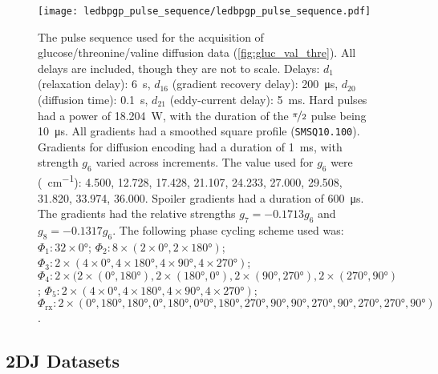\begin{figure}[H]
    \texttt{[image: ledbpgp\_pulse\_sequence/ledbpgp\_pulse\_sequence.pdf]}
    \caption[
        The pulse sequence used for the acquisition of the glucose/threonine/valine
        diffusion data presented in \cref{fig:gluc_val_thre}.
    ]{
        The pulse sequence used for the acquisition of glucose/threonine/valine
        diffusion data (\cref{fig:gluc_val_thre}). All
        delays are included, though they are not to scale.
        Delays:
        $d_1$ (relaxation delay): \qty{6}{\second},
        $d_{16}$ (gradient recovery delay): \qty{200}{\micro\second},
        $d_{20}$ (diffusion time): \qty{0.1}{\second},
        $d_{21}$ (eddy-current delay): \qty{5}{\milli\second}.
        Hard pulses had a power of \qty{18.204}{\watt},
        with the duration of the $\nicefrac{\pi}{2}$ pulse being
        \qty{10}{\micro\second}.
        All gradients had a smoothed square profile
        (\texttt{SMSQ10.100}).
        Gradients for diffusion encoding had a duration of
        \qty{1}{\milli\second}, with strength $g_6$ varied across increments.
        The value used for $g_6$ were (\unit{\gauss \per \centi \meter}):
        4.500,
        12.728,
        17.428,
        21.107,
        24.233,
        27.000,
        29.508,
        31.820,
        33.974,
        36.000.
        Spoiler gradients had a duration of \qty{600}{\micro\second}. The
        gradients had the relative strengths $g_7=-0.1713g_6$ and
        $g_8=-0.1317g_6$.
        The following phase cycling scheme used was:
        $\Phi_1: 32 \times \ang{0}$;
        $\Phi_2: 8 \times (2 \times \ang{0}, 2 \times \ang{180})$;
        $\Phi_3: 2 \times (4 \times \ang{0}, 4 \times \ang{180}, 4 \times \ang{90}, 4 \times \ang{270})$;
        $\Phi_4: 2 \times (2 \times (\ang{0}, \ang{180}), 2 \times (\ang{180}, \ang{0}), 2 \times (\ang{90}, \ang{270}), 2 \times (\ang{270}, \ang{90})$;
        $\Phi_5: 2 \times (4 \times \ang{0}, 4 \times \ang{180}, 4 \times \ang{90}, 4 \times \ang{270})$;
        $\Phi_{\text{rx}}: 2 \times (\ang{0}, \ang{180}, \ang{180}, \ang{0}, \ang{180}, \ang{0} \ang{0}, \ang{180},
        \ang{270}, \ang{90}, \ang{90}, \ang{270}, \ang{90}, \ang{270}, \ang{270}, \ang{90})$.
    }
    \label{fig:ledbpgp2s}
\end{figure}

\subsection{\acs{2DJ} Datasets}
\label{subsec:cupid-experimental}


